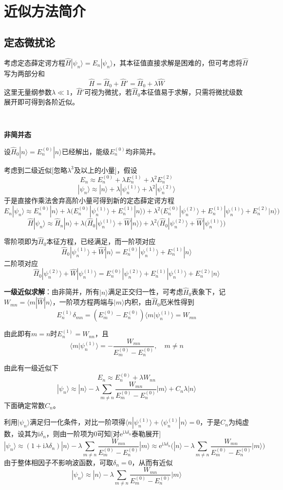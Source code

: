 \documentclass[a4paper,UTF8,fontset=windows]{ctexart}
\newcommand*{\ir}{\mathrm{i}}
\newcommand*{\er}{\mathrm{e}}
\newcommand*{\ket}[1]{|#1\rangle}
\newcommand*{\bk}[2]{\langle#1|#2\rangle}
\newcommand*{\blk}[3]{\langle#1|#2|#3\rangle}
\begin{document}
\section{近似方法简介}
\subsection{定态微扰论}
考虑定态薛定谔方程$\hat{H}\ket{\psi_n}=E_n\ket{\psi_n}$，其本征值直接求解是困难的，但可考虑将$\hat{H}$写为两部分和
$$\hat{H}=\hat{H}_0+\hat{H}'=\hat{H}_0+\lambda\hat{W}$$
这里无量纲参数$\lambda\ll1$，$\hat{H}'$可视为微扰，若$\hat{H}_0$本征值易于求解，只需将微扰级数展开即可得到各阶近似。

\

\textbf{非简并态}

设$\hat{H}_0\ket{n}=E_n^{(0)}\ket{n}$已经解出，能级$E_n^{(0)}$均非简并。

考虑到二级近似[忽略$\lambda^3$及以上的小量]，假设
$$E_n\approx E_n^{(0)}+\lambda E_n^{(1)}+\lambda^2E_n^{(2)}$$
$$\ket{\psi_n}\approx\ket{n}+\lambda\ket{\psi_n^{(1)}}+\lambda^2\ket{\psi_n^{(2)}}$$
于是直接作乘法舍弃高阶小量可得到新的定态薛定谔方程
$$E_n\ket{\psi_n}\approx E_n^{(0)}\ket{n}+\lambda\big(E_n^{(0)}\ket{\psi_n^{(1)}}+E_n^{(1)}\ket{n}\big)+\lambda^2\big(E_n^{(0)}\ket{\psi_n^{(2)}}+E_n^{(1)}\ket{\psi_n^{(1)}}+E_n^{(2)}\ket{n}\big)$$
$$\hat{H}\ket{\psi_n}\approx\hat{H}_n\ket{n}+\lambda\big(\hat{H}_0\ket{\psi_n^{(1)}}+\hat{W}\ket{n}\big)+\lambda^2\big(\hat{H}_0\ket{\psi_n^{(2)}}+\hat{W}\ket{\psi_n^{(1)}}\big)$$

零阶项即为$\hat{H}_0$本征方程，已经满足，而一阶项对应
$$\hat{H}_0\ket{\psi_n^{(1)}}+\hat{W}\ket{n}=E_n^{(0)}\ket{\psi_n^{(1)}}+E_n^{(1)}\ket{n}$$
二阶项对应
$$\hat{H}_0\ket{\psi_n^{(2)}}+\hat{W}\ket{\psi_n^{(1)}}=E_n^{(0)}\ket{\psi_n^{(2)}}+E_n^{(1)}\ket{\psi_n^{(1)}}+E_n^{(2)}\ket{n}$$

\textbf{一级近似求解}：由非简并，所有$\ket{n}$满足正交归一性，可考虑$\hat{H}_0$表象下，记$W_{mn}=\blk{m}{\hat{W}}{n}$，一阶项方程两端与$\ket{m}$内积，由$\hat{H}_0$厄米性得到
$$E_n^{(1)}\delta_{mn}=(E_m^{(0)}-E_n^{(0)})\bk{m}{\psi_n^{(1)}}=W_{mn}$$

由此即有$m=n$时$E_n^{(1)}=W_{nn}$，且
$$\bk{m}{\psi_n^{(1)}}=-\frac{W_{mn}}{E_m^{(0)}-E_n^{(0)}},\quad m\ne n$$

由此有一级近似下
$$E_n\approx E_n^{(0)}+\lambda W_{nn}$$
$$\ket{\psi_n}\approx\ket{n}-\lambda\sum_{m\ne n}\frac{W_{mn}}{E_m^{(0)}-E_n^{(0)}}\ket{m}+C_n\lambda\ket{n}$$
下面确定常数$C_n$。

利用$\ket{\psi_n}$满足归一化条件，对比一阶项得$\bk{n}{\psi_n^{(1)}}+\bk{\psi_n^{(1)}}{n}=0$，于是$C_n$为纯虚数，设其为$\ir\delta_n$，则由一阶项为0可知[对$\er^{\ir\lambda\delta_n}$泰勒展开]
$$\ket{\psi_n}\approx(1+\ir\lambda\delta_n)\ket{n}-\lambda\sum_{m\ne n}\frac{W_{mn}}{E_m^{(0)}-E_n^{(0)}}\ket{m}\approx\er^{\ir\lambda\delta_n}\bigg(\ket{n}-\lambda\sum_{m\ne n}\frac{W_{mn}}{E_m^{(0)}-E_n^{(0)}}\ket{m}\bigg)$$
由于整体相因子不影响波函数，可取$\delta_n=0$，从而有近似
$$\ket{\psi_n}\approx\ket{n}-\lambda\sum_{m\ne n}\frac{W_{mn}}{E_m^{(0)}-E_n^{(0)}}\ket{m}$$
\end{document}
